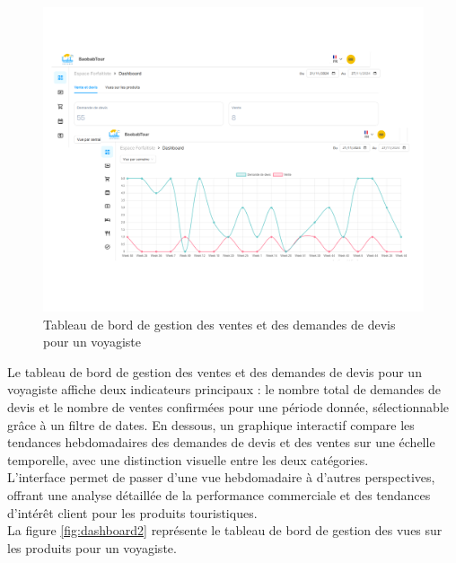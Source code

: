 \documentclass[12pt]{report}
\begin{document}
			\begin{figure}[h]
				\centering
				\includegraphics[width=\textwidth]{dashboard1.png}
				\caption{Tableau de bord de gestion des ventes et des demandes de devis pour un voyagiste}
				\label{fig:dashboard1}
			\end{figure}
			\FloatBarrier

			Le tableau de bord de gestion des ventes et des demandes de devis pour un voyagiste affiche deux indicateurs principaux : le nombre total de demandes de devis et le nombre de ventes confirmées pour une période donnée, sélectionnable grâce à un filtre de dates. En dessous, un graphique interactif compare les tendances hebdomadaires des demandes de devis et des ventes sur une échelle temporelle, avec une distinction visuelle entre les deux catégories.\\

			L'interface permet de passer d'une vue hebdomadaire à d'autres perspectives, offrant une analyse détaillée de la performance commerciale et des tendances d'intérêt client pour les produits touristiques.\\


			La figure \ref{fig:dashboard2} représente le tableau de bord de gestion des vues sur les produits pour un voyagiste.
\end{document}

